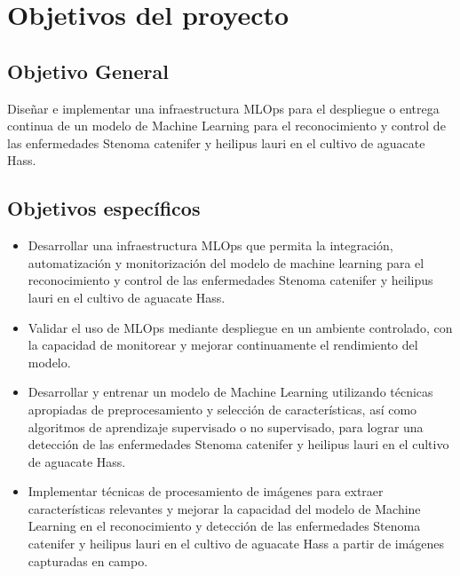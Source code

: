 \section{Objetivos del proyecto}




\subsection{Objetivo General}
Diseñar e implementar una infraestructura MLOps para el despliegue o entrega continua de un modelo de Machine Learning para el reconocimiento y control de las enfermedades Stenoma catenifer y heilipus lauri en el cultivo de aguacate Hass.




\subsection{Objetivos específicos}
\begin{itemize}
  \item Desarrollar una infraestructura MLOps que permita la integración, automatización y monitorización del modelo de machine learning para el reconocimiento y control de las enfermedades Stenoma catenifer y heilipus lauri en el cultivo de aguacate Hass.
  \item Validar el uso de MLOps mediante despliegue en un ambiente controlado, con la capacidad de monitorear y mejorar continuamente el rendimiento del modelo.
  \item Desarrollar y entrenar un modelo de Machine Learning utilizando técnicas apropiadas de preprocesamiento y selección de características, así como algoritmos de aprendizaje supervisado o no supervisado, para lograr una detección de las enfermedades Stenoma catenifer y heilipus lauri en el cultivo de aguacate Hass.
  \item Implementar técnicas de procesamiento de imágenes para extraer características relevantes y mejorar la capacidad del modelo de Machine Learning en el reconocimiento y detección de las enfermedades Stenoma catenifer y heilipus lauri en el cultivo de aguacate Hass a partir de imágenes capturadas en campo.
\end{itemize}



